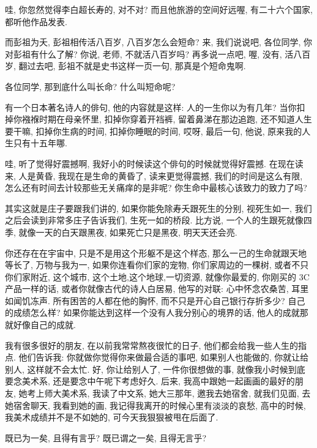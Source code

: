 \documentclass[11pt]{article}
\begin{document}
哇, 你忽然觉得李白超长寿的, 对不对? 而且他旅游的空间好远喔, 有二十六个国家, 都听他作品发表.

{\color{blue} 而彭祖为夭}, 彭祖相传活八百岁, 八百岁怎么会短命? 来, 我们说说吧, 各位同学, 你对彭祖有什么了解? 你说, 老师, 不就活八百岁吗? 再多说一点吧, 喔, 没有, 活八百岁, 翻过去吧, 彭祖不就是史书这样一页一句, 那真是个短命鬼啊. 

各位同学, 那到底什么叫长命? 什么叫短命呢? 

有一个日本著名诗人的俳句, 他的内容就是这样: 人的一生你以为有几年? 当你扣掉你襁褓时期在母亲怀里, 扣掉你穿着开裆裤, 留着鼻涕在那边追跑, 还不知道人生要干嘛, 扣掉你生病的时间, 扣掉你睡眠的时间, 哎呀, 最后一句, 他说, 原来我的人生只有十五年哪.

哇, 听了觉得好震撼啊, 我好小的时候读这个俳句的时候就觉得好震撼. 在现在读来, 人是黄昏, 我现在是生命的黄昏了, 读来更觉得震撼, 我们的时间是这么有限, 怎么还有时间去计较那些无关痛痒的是非呢? 你生命中最核心该致力的致力了吗?

其实这就是庄子要跟我们讲的, 如果你能免除寿夭跟死生的分别, 视死生如一, 我们之后会读到非常多庄子告诉我们, 生死一如的桥段. 比方说, 一个人的生跟死就像四季, 就像一天的白天跟黑夜, 如果死亡只是黑夜, 明天天还会亮.

你还存在在宇宙中, 只是不是用这个形躯不是这个样态, 那么一己的生命就跟天地等长了, {\color{blue} 万物与我为一}, 如果你连看你们家的宠物, 你们家周边的一棵树, 或者不只你们家附近, 这个城市, 这个土地,这个地球,一切资源, 就像你最爱的, 你刚买的 3C 产品一样的话, 或者你就像古代的诗人白居易, 他写的对联: 心中怀念农桑苦, 耳里如闻饥冻声. 所有困苦的人都在他的胸怀, 而不只是开心自己银行存折多少? 自己的成绩怎么样? 如果你能达到这样一个没有人我分别心的境界的话, 他人的成就那就好像自己的成就. 

我有很多很好的朋友, 在以前我常常熬夜很忙的日子, 他们都会给我一些人生的指点. 他们告诉我: 你就做你觉得你来做最合适的事吧, 如果别人也能做的, 你就让给别人, 这样就不会太忙. 好, 你让给别人了, 一件你很想做的事, 就像我小时候到底要念美术系, 还是要念中午呢下考虑好久. 后来, 我高中跟她一起画画的最好的朋友, 她考上师大美术系, 我读了中文系, 她大三那年, 邀我去她宿舍, 就我们见面, 去她宿舍聊天, 我看到她的画, 我记得我离开的时候心里有淡淡的哀愁, 高中的时候, 我美术成绩并不是不如她的, 可今天我狠狠被甩在后面了.



\begin{center}
	{\color{magenta} 既已为一矣, 且得有言乎? 既已谓之一矣, 且得无言乎?}
\end{center}

\vspace{-0.5cm}
\end{document}
